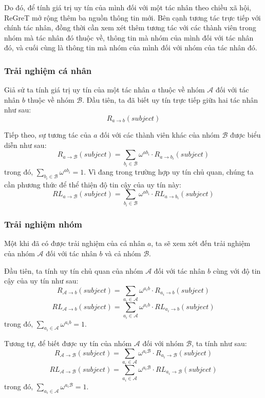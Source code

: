 Do đó, để tính giá trị uy tín của mình đối với một tác nhân theo chiều xã hội, ReGreT mở rộng thêm ba nguồn thông tin mới. Bên cạnh tương tác trực tiếp với chính tác nhân, đồng thời cần xem xét thêm
tương tác với các thành viên trong nhóm mà tác nhân đó thuộc về, thông tin mà nhóm của mình đối với tác nhân đó, và cuối cùng là thông tin mà nhóm của mình đối với nhóm của tác nhân đó.

\subsubsection{Trải nghiệm cá nhân}

Giả sử ta tính giá trị uy tín của một tác nhân $a$ thuộc về nhóm $\mathcal{A}$ đối với tác nhân $b$ thuộc về nhóm $\mathcal{B}$.
Đầu tiên, ta đã biết uy tín trực tiếp giữa hai tác nhân như sau:
\[R_{a \rightarrow b}(subject)\]

Tiếp theo, sự tương tác của $a$ đối với các thành viên khác của nhóm $\mathcal{B}$ được biểu diễn như sau:
\[R_{a \rightarrow \mathcal{B}}(subject)=\sum_{b_i \in \mathcal{B}} \omega^{ab_i} \cdot R_{a \rightarrow b_i}(subject)\]
trong đó, $\displaystyle\sum_{b_i \in \mathcal{B}} \omega^{ab_i} = 1$.
Vì đang trong trường hợp uy tín chủ quan, chúng ta cần phương thức để thể thiện độ tin cậy của uy tín này:
\[RL_{a \rightarrow \mathcal{B}}(subject)=\sum_{b_i \in \mathcal{B}} \omega^{ab_i} \cdot RL_{a \rightarrow b_i}(subject)\]

\subsubsection{Trải nghiệm nhóm}

Một khi đã có được trải nghiệm của cá nhân $a$, ta sẽ xem xét đến trải nghiệm của nhóm $\mathcal{A}$ đối với tác nhân $b$ và cả nhóm $\mathcal{B}$.

Đầu tiên, ta tính uy tín chủ quan của nhóm $\mathcal{A}$ đối với tác nhân $b$ cùng với độ tin cậy của uy tín như sau:
\[R_{\mathcal{A} \rightarrow b}(subject)=\sum_{a_i \in \mathcal{A}} \omega^{a_ib} \cdot R_{a_i \rightarrow b}(subject)\]
\[RL_{\mathcal{A} \rightarrow b}(subject)=\sum_{a_i \in \mathcal{A}} \omega^{a_ib} \cdot RL_{a_i \rightarrow b}(subject)\]
trong đó, $\displaystyle\sum_{a_i \in \mathcal{A}} \omega^{a_ib} = 1$.

Tương tự, để biết được uy tín của nhóm $\mathcal{A}$ đối với nhóm $\mathcal{B}$, ta tính như sau:
\[R_{\mathcal{A} \rightarrow \mathcal{B}}(subject)=\sum_{a_i \in \mathcal{A}} \omega^{a_i\mathcal{B}} \cdot R_{a_i \rightarrow \mathcal{B}}(subject)\]
\[RL_{\mathcal{A} \rightarrow \mathcal{B}}(subject)=\sum_{a_i \in \mathcal{A}} \omega^{a_i\mathcal{B}} \cdot RL_{a_i \rightarrow \mathcal{B}}(subject)\]
trong đó, $\displaystyle\sum_{a_i \in \mathcal{A}} \omega^{a_i\mathcal{B}} = 1$.

